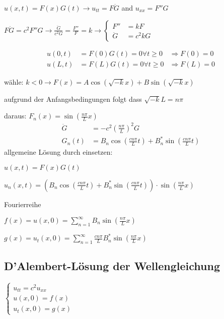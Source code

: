 \documentclass[10pt,a4paper]{scrartcl}
\begin{document}
\begin{multicols*}{3}
	 
	
	$u(x,t) = F(x)G(t) \rightarrow u_{tt} = F \ddot{G}$ and $u_{xx}=F''G$

	 
	 
	$F\ddot{G}=c^2F''G \rightarrow \frac{\ddot{G}}{c^2G}=\frac{F''}{F}=k\rightarrow
	\begin{cases}
	F''&=kF\\
	\ddot{G}&=c^2kG
	\end{cases}
	$
	
	\begin{align*}
	u(0,t)&=F(0)G(t)=0 \forall t\geq 0 & \Rightarrow F(0) = 0\\	
	u(L,t)&=F(L)G(t)=0 \forall t\geq 0 & \Rightarrow F(L) = 0
	\end{align*}
	
	wähle: $k<0 \rightarrow F(x) =A\cos(\sqrt{-k}x)+B\sin(\sqrt{-k}x)$
	
	aufgrund der Anfangsbedingungen folgt dass $\sqrt{-k}L=n\pi$
	
	daraus: $F_n(x)=\sin(\frac{n\pi}{L}x)$
	\begin{align*}
	\ddot{G}&=-c^2(\frac{n\pi}{L})^2G\\
	G_n(t)&=B_n\cos(\frac{cn\pi}{L}t)+B_n^*\sin(\frac{cn\pi}{L}t)
	\end{align*}
	allgemeine Lösung durch einsetzen: 
	
	$u(x,t)=F(x)G(t)$
	
	$u_n(x,t)=(B_n\cos(\frac{cn\pi}{L}t)+B_n^*\sin(\frac{cn\pi}{L}t))\cdot \sin(\frac{n\pi}{L}x)$
	
	Fourierreihe 
	
	$f(x) = u(x,0) = \sum_{n=1}^\infty{B_n\sin(\frac{n\pi}{L}x)}$
	
	\finn
	
	
	\finn
	
	$g(x)=u_t(x,0)=\sum_{n=1}^\infty{\frac{cn\pi}{L}B_n^*\sin(\frac{n\pi}{L}x)}$
	\finn	
	
	
	\finn	
	
	\subsection{D'Alembert-Lösung der Wellengleichung}
	\begin{center}	
	$\begin{cases}
	u_{tt} = c^2u_{xx}\\
	u(x,0)=f(x)\\
	u_t(x,0)=g(x)
	\end{cases}$
	\end{center}
	

\end{multicols*}
\end{document}
